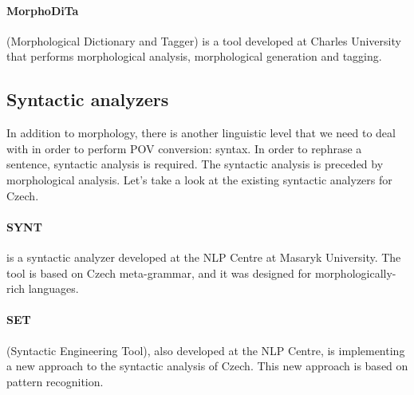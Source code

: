 \paragraph{MorphoDiTa} (Morphological Dictionary and Tagger) is a tool developed at Charles University that performs morphological analysis, morphological generation and tagging. \cite{strakova14}

\subsection{Syntactic analyzers}

In addition to morphology, there is another linguistic level that we need to deal with in order to perform POV conversion: syntax. In order to rephrase a sentence, syntactic analysis is required. The syntactic analysis is preceded by morphological analysis. Let's take a look at the existing syntactic analyzers for Czech.

\paragraph{SYNT} is a syntactic analyzer developed at the NLP Centre at Masaryk University. The tool is based on Czech meta-grammar, and it was designed for morphologically-rich languages.

\paragraph{SET} (Syntactic Engineering Tool), also developed at the NLP Centre, is implementing a new approach to the syntactic analysis of Czech. This new approach is based on pattern recognition. \cite{set}
